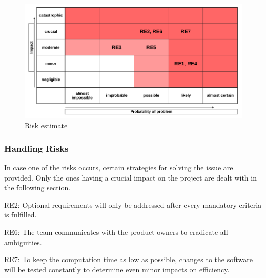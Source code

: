 \begin{figure}[h]
	\begin{center}
		\includegraphics[width= 15cm]{figures/risikoabschaetzung.png}
		\caption{Risk estimate}
	\end{center}
\end{figure}

\subsubsection{Handling Risks}

In case one of the risks occurs, certain strategies for solving the issue are provided. Only the ones having a crucial impact on the project are dealt with in the following section. 

\begin{aims}
	
	\item[RE2:]Optional requirements will only be addressed after every mandatory criteria is fulfilled.
	\item[RE6:]The team communicates with the product owners to eradicate all ambiguities.
	\item[RE7:]To keep the computation time as low as possible, changes to the software will be tested constantly to 						   determine even minor impacts on efficiency. 	
	
\end{aims}

\clearpage


%	
%	



